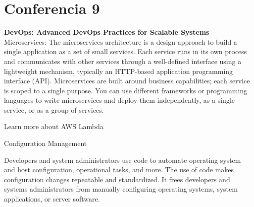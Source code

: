 \documentclass[12pt]{book}
\begin{document}



\chapter{Conferencia 9}
\normalfont\LARGE \textbf{DevOps: Advanced DevOps Practices for Scalable Systems}
\normalfont\small\\

Microservices:
The microservices architecture is a design approach to build a single application as a set of small services. Each service runs in its own process and communicates with other services through a well-defined interface using a lightweight mechanism, typically an HTTP-based application programming interface (API). Microservices are built around business capabilities; each service is scoped to a single purpose. You can use different frameworks or programming languages to write microservices and deploy them independently, as a single service, or as a group of services.

Learn more about AWS Lambda

Configuration Management

Developers and system administrators use code to automate operating system and host configuration, operational tasks, and more. The use of code makes configuration changes repeatable and standardized. It frees developers and systems administrators from manually configuring operating systems, system applications, or server software.
\end{document}
